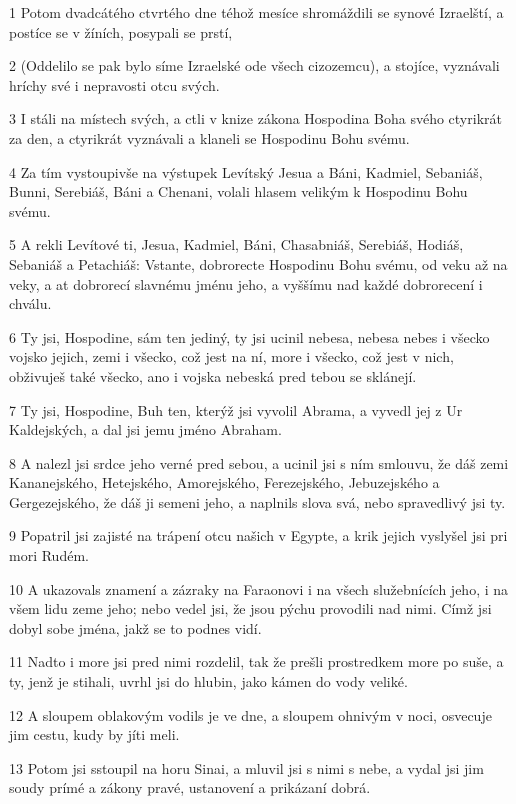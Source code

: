 \par 1 Potom dvadcátého ctvrtého dne téhož mesíce shromáždili se synové Izraelští, a postíce se v žíních, posypali se prstí,
\par 2 (Oddelilo se pak bylo síme Izraelské ode všech cizozemcu), a stojíce, vyznávali hríchy své i nepravosti otcu svých.
\par 3 I stáli na místech svých, a ctli v knize zákona Hospodina Boha svého ctyrikrát za den, a ctyrikrát vyznávali a klaneli se Hospodinu Bohu svému.
\par 4 Za tím vystoupivše na výstupek Levítský Jesua a Báni, Kadmiel, Sebaniáš, Bunni, Serebiáš, Báni a Chenani, volali hlasem velikým k Hospodinu Bohu svému.
\par 5 A rekli Levítové ti, Jesua, Kadmiel, Báni, Chasabniáš, Serebiáš, Hodiáš, Sebaniáš a Petachiáš: Vstante, dobrorecte Hospodinu Bohu svému, od veku až na veky, a at dobrorecí slavnému jménu jeho, a vyššímu nad každé dobrorecení i chválu.
\par 6 Ty jsi, Hospodine, sám ten jediný, ty jsi ucinil nebesa, nebesa nebes i všecko vojsko jejich, zemi i všecko, což jest na ní, more i všecko, což jest v nich, obživuješ také všecko, ano i vojska nebeská pred tebou se sklánejí.
\par 7 Ty jsi, Hospodine, Buh ten, kterýž jsi vyvolil Abrama, a vyvedl jej z Ur Kaldejských, a dal jsi jemu jméno Abraham.
\par 8 A nalezl jsi srdce jeho verné pred sebou, a ucinil jsi s ním smlouvu, že dáš zemi Kananejského, Hetejského, Amorejského, Ferezejského, Jebuzejského a Gergezejského, že dáš ji semeni jeho, a naplnils slova svá, nebo spravedlivý jsi ty.
\par 9 Popatril jsi zajisté na trápení otcu našich v Egypte, a krik jejich vyslyšel jsi pri mori Rudém.
\par 10 A ukazovals znamení a zázraky na Faraonovi i na všech služebnících jeho, i na všem lidu zeme jeho; nebo vedel jsi, že jsou pýchu provodili nad nimi. Címž jsi dobyl sobe jména, jakž se to podnes vidí.
\par 11 Nadto i more jsi pred nimi rozdelil, tak že prešli prostredkem more po suše, a ty, jenž je stihali, uvrhl jsi do hlubin, jako kámen do vody veliké.
\par 12 A sloupem oblakovým vodils je ve dne, a sloupem ohnivým v noci, osvecuje jim cestu, kudy by jíti meli.
\par 13 Potom jsi sstoupil na horu Sinai, a mluvil jsi s nimi s nebe, a vydal jsi jim soudy prímé a zákony pravé, ustanovení a prikázaní dobrá.
